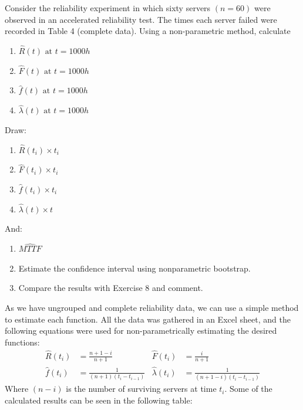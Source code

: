 \documentclass{article}
\begin{document}
\setcounter{Question}{8}
\begin{question}
    Consider the reliability experiment in which sixty servers \((n = 60)\) were observed in an accelerated reliability test. The times each server failed were recorded in Table 4 (complete data). Using a non-parametric method, calculate
    \begin{enumerate}[label=(\alph*)]
        \item \(\hat{R}(t) \text{ at } t = 1000h\)
        \item \(\hat{F}(t) \text{ at } t = 1000h\)
        \item \(\hat{f}(t) \text{ at } t = 1000h\)
        \item \(\hat{\lambda}(t) \text{ at } t = 1000h\)
    \end{enumerate}
    Draw:
    \begin{enumerate}[label=(\alph*), start=5]
        \item \(\hat{R}(t_i) \times t_i\)
        \item \(\hat{F}(t_i) \times t_i\)
        \item \(\hat{f}(t_i) \times t_i\)
        \item \(\hat{\lambda}(t) \times t\)
    \end{enumerate}
    And:
    \begin{enumerate}[label=(\alph*), start=8]
        \item \(\widehat{MTTF}\)
        \item Estimate the confidence interval using nonparametric bootstrap.
        \item Compare the results with Exercise 8 and comment.
    \end{enumerate}
\end{question}

As we have ungrouped and complete reliability data, we can use a simple method to estimate each function. All the data was gathered in an Excel sheet, and the following equations were used for non-parametrically estimating the desired functions:
    \begin{align*}
        \hat{R}(t_i) &= \frac{n+1-i}{n+1}    &   \hat{F}(t_i) &= \frac{i}{n+1} \\
        \hat{f}(t_i) &= \frac{1}{(n+1)(t_i - t_{i - 1})}   &   \hat{\lambda}(t_i) &= \frac{1}{(n+1-i)(t_i - t_{i-1})}
    \end{align*}
    Where $(n - i)$ is the number of surviving servers at time $t_i$. Some of the calculated results can be seen in the following table:
\end{document}
